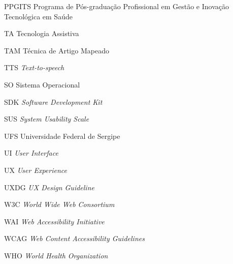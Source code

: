 \begin{siglas}
	\item[PPGITS]{Programa de Pós-graduação Profissional em Gestão e Inovação Tecnológica em Saúde}
	\item[TA]{Tecnologia Assistiva}
	\item[TAM]{Técnica de Artigo Mapeado}
	\item[TTS]{\textit{Text-to-speech}}
	\item[SO]{Sistema Operacional}
	\item[SDK]{\textit{Software Development Kit}}
	\item[SUS]{\textit{System Usability Scale}}
	\item[UFS]{Universidade Federal de Sergipe}
	\item[UI]{\textit{User Interface}}
	\item[UX]{\textit{User Experience}}
	\item[UXDG]{\textit{UX Design Guideline}}
	\item[W3C]{\textit{World Wide Web Consortium}}
	\item[WAI]{\textit{Web Accessibility Initiative}}
	\item[WCAG]{\textit{Web Content Accessibility Guidelines}}
	\item[WHO]{\textit{World Health Organization}}
\end{siglas}